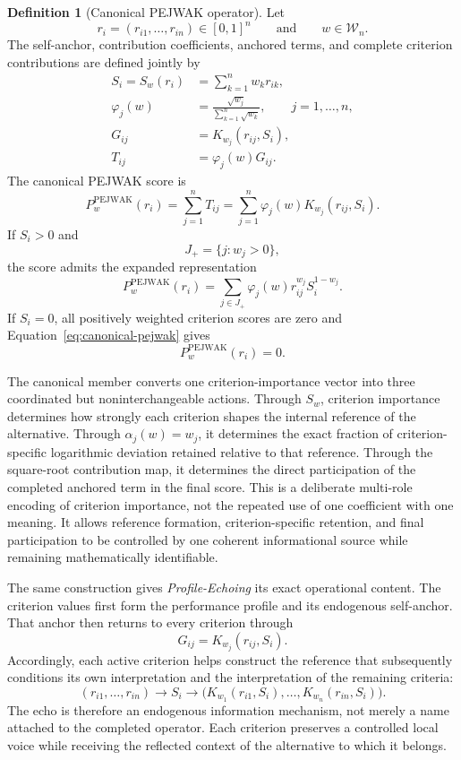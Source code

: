 \documentclass[reqno,11pt]{amsart}
\theoremstyle{definition}
\newtheorem{definition}{Definition}
\theoremstyle{plain}
\theoremstyle{remark}
\begin{document}
\begin{definition}[Canonical PEJWAK operator]
Let
\[
r_i=(r_{i1},\ldots,r_{in})\in[0,1]^n
\qquad\text{and}\qquad
w\in\mathcal W_n.
\]
The self-anchor, contribution coefficients, anchored terms, and complete
criterion contributions are defined jointly by
\[
\begin{aligned}
S_i=S_w(r_i)&=\sum_{k=1}^{n}w_kr_{ik},\\
\varphi_j(w)&=\frac{\sqrt{w_j}}{\sum_{k=1}^{n}\sqrt{w_k}},
\qquad j=1,\ldots,n,\\
G_{ij}&=K_{w_j}(r_{ij},S_i),\\
T_{ij}&=\varphi_j(w)G_{ij}.
\end{aligned}
\]
The canonical PEJWAK score is
\begin{equation}
P_w^{\mathrm{PEJWAK}}(r_i)
=
\sum_{j=1}^{n}T_{ij}
=
\sum_{j=1}^{n}
\varphi_j(w)
K_{w_j}(r_{ij},S_i).
\label{eq:canonical-pejwak}
\end{equation}
If $S_i>0$ and
\[
J_+=\{j:w_j>0\},
\]
the score admits the expanded representation
\begin{equation}
P_w^{\mathrm{PEJWAK}}(r_i)
=
\sum_{j\in J_+}
\varphi_j(w)
r_{ij}^{w_j}
S_i^{1-w_j}.
\label{eq:canonical-expanded}
\end{equation}
If $S_i=0$, all positively weighted criterion scores are zero and Equation~\eqref{eq:canonical-pejwak} gives
\[
P_w^{\mathrm{PEJWAK}}(r_i)=0.
\]
\end{definition}

The canonical member converts one criterion-importance vector into three
coordinated but noninterchangeable actions. Through \(S_w\), criterion
importance determines how strongly each criterion shapes the internal
reference of the alternative. Through
\(\alpha_j(w)=w_j\), it determines the exact fraction of criterion-specific
logarithmic deviation retained relative to that reference. Through the
square-root contribution map, it determines the direct participation of
the completed anchored term in the final score. This is a deliberate
multi-role encoding of criterion importance, not the repeated use of one
coefficient with one meaning. It allows reference formation, criterion-specific retention, and final
participation to be controlled by one coherent informational source while
remaining mathematically identifiable.

The same construction gives \textit{Profile-Echoing} its exact
operational content. The criterion values first form the performance
profile and its endogenous self-anchor. That anchor then returns to every
criterion through
\[
G_{ij}=K_{w_j}(r_{ij},S_i).
\]
Accordingly, each active criterion helps construct the reference that
subsequently conditions its own interpretation and the interpretation of
the remaining criteria:
\[
(r_{i1},\ldots,r_{in})
\longrightarrow
S_i
\longrightarrow
\bigl(
K_{w_1}(r_{i1},S_i),\ldots,
K_{w_n}(r_{in},S_i)
\bigr).
\]
The echo is therefore an endogenous information mechanism, not merely a
name attached to the completed operator. Each criterion preserves a
controlled local voice while receiving the reflected context of the
alternative to which it belongs.
\end{document}
